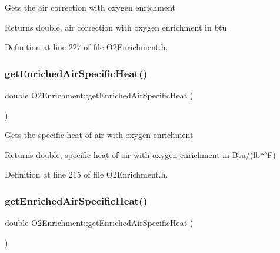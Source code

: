 Gets the air correction with oxygen enrichment \begin{DoxyReturn}{Returns}
double, air correction with oxygen enrichment in btu 
\end{DoxyReturn}


Definition at line 227 of file O2\+Enrichment.\+h.

\mbox{\label{class_o2_enrichment_ac9fc3524b7243fbaac29884c1e6c5748}} 
\subsubsection{\texorpdfstring{get\+Enriched\+Air\+Specific\+Heat()}{getEnrichedAirSpecificHeat()}\hspace{0.1cm}{\footnotesize\ttfamily [1/3]}}
{\footnotesize\ttfamily double O2\+Enrichment\+::get\+Enriched\+Air\+Specific\+Heat (\begin{DoxyParamCaption}{ }\end{DoxyParamCaption})\hspace{0.3cm}{\ttfamily [inline]}}

Gets the specific heat of air with oxygen enrichment \begin{DoxyReturn}{Returns}
double, specific heat of air with oxygen enrichment in Btu/(lb$\ast$°F) 
\end{DoxyReturn}


Definition at line 215 of file O2\+Enrichment.\+h.

\mbox{\label{class_o2_enrichment_ac9fc3524b7243fbaac29884c1e6c5748}} 
\subsubsection{\texorpdfstring{get\+Enriched\+Air\+Specific\+Heat()}{getEnrichedAirSpecificHeat()}\hspace{0.1cm}{\footnotesize\ttfamily [2/3]}}
{\footnotesize\ttfamily double O2\+Enrichment\+::get\+Enriched\+Air\+Specific\+Heat (\begin{DoxyParamCaption}{ }\end{DoxyParamCaption})\hspace{0.3cm}{\ttfamily [inline]}}

